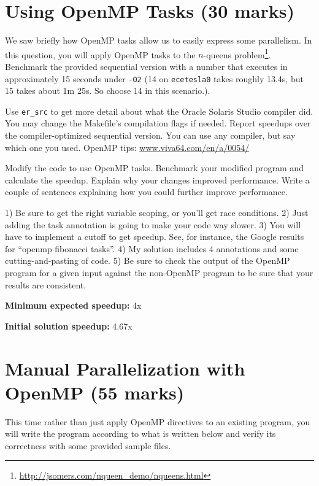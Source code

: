 \documentclass[letterpaper,10pt]{article}
\begin{document}
\section{Using OpenMP Tasks (30 marks)}

We saw briefly how OpenMP tasks allow us to easily express some parallelism.
In this question, you will apply OpenMP tasks to the $n$-queens
problem\footnote{\url{http://jsomers.com/nqueen_demo/nqueens.html}}.
Benchmark the provided sequential version with a number that executes in approximately
15 seconds under {\tt -O2} (14 on {\tt ecetesla0} takes roughly 13.4s, but 15 takes about 1m 25s. 
So choose 14 in this scenario.).

 Use {\tt er\_src} to get more detail about what the Oracle
Solaris Studio compiler did.  You may change the
Makefile's compilation flags if needed. Report speedups over the
compiler-optimized sequential version.  You can use any compiler, but
say which one you used. OpenMP tips:
  \url{www.viva64.com/en/a/0054/}

Modify the code to use OpenMP tasks. Benchmark your modified program
and calculate the speedup. Explain why your
changes improved performance. Write a couple of sentences explaining how
you could further improve performance.

\vspace*{1em}
 1) Be sure to get the right variable scoping, or
you'll get race conditions. 2) Just adding the task annotation is going
to make your code way slower. 3) You will have to implement a cutoff to
get speedup. See, for instance, the Google results for ``openmp
fibonacci tasks''. 4) My solution includes 4 annotations and some
cutting-and-pasting of code. 5) Be sure to check the output of the
OpenMP program for a given input against the non-OpenMP program to be
sure that your results are consistent.

\squishlist
  \item {\bf Minimum expected speedup:} 4x
  \item {\bf Initial solution speedup:} 4.67x
\squishend

\newpage

\section{Manual Parallelization with OpenMP (55 marks)}

This time rather than just apply OpenMP directives to an existing program, you will write the program according to what is written below and verify its correctness with some provided sample files.
\end{document}
